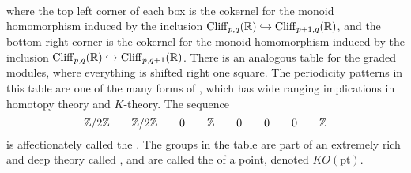  \\\\\\
where the top left corner of each box is the cokernel for the monoid homomorphism
induced by the inclusion $\operatorname{Cliff}_{p,q}(\mathbb{R}) \hookrightarrow \operatorname{Cliff}_{p+1,q}(\mathbb{R})$,
and the bottom right  corner is the cokernel for the monoid homomorphism induced
by the inclusion $\operatorname{Cliff}_{p,q}(\mathbb{R}) \hookrightarrow \operatorname{Cliff}_{p,q+1}(\mathbb{R})$. There
is an analogous table for the graded modules, where everything is shifted right
one square. The periodicity patterns in this table are one of the many
forms of , which has wide ranging implications in homotopy
theory and $K$-theory. The sequence
\[
 \mathbb{Z}/2\mathbb{Z} \qquad \mathbb{Z}/2\mathbb{Z} \qquad 0 \qquad \mathbb{Z} \qquad 0 \qquad 0 \qquad 0 \qquad \mathbb{Z}
\]
is affectionately called the . The groups in the table are part of
an extremely rich and deep theory called , and are called the
 of a point, denoted $KO(\text{pt})$.
%
